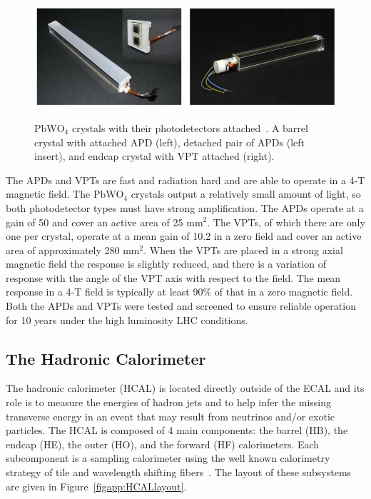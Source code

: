 \begin{figure}[!Hh]
       \centering
       \includegraphics[scale=0.5]{Figures/ECALphotodetectors.png} \\
       \caption[Photodetectors and crystal modules in the CMS eletromagnetic calorimeter.]{$\text{PbWO}_4$ crystals with their photodetectors attached~\cite{CMStdr}.  A barrel crystal with attached APD (left), detached pair of APDs (left insert), and endcap crystal with VPT attached (right).}
\label{figapp:ECALphotodetectors}
\end{figure}

The APDs and VPTs are fast and radiation hard and are able to operate in a 4-T magnetic field.  The $\text{PbWO}_4$ crystals output a relatively small amount of light, so both photodetector types must have strong amplification.  The APDs operate at a gain of 50 and cover an active area of 25 $\text{mm}^2$.  The VPTs, of which there are only one per crystal, operate at a mean gain of 10.2 in a zero field and cover an active area of approximately 280 $\text{mm}^2$.  When the VPTs are placed in a strong axial magnetic field the response is slightly reduced, and there is a variation of response with the angle of the VPT axis with respect to the field.  The mean response in a 4-T field is typically at least 90\% of that in a zero magnetic field.  Both the APDs and VPTs were tested and screened to ensure reliable operation for 10 years under the high luminosity LHC conditions.



\subsection{The Hadronic Calorimeter}
\label{hcal}


The hadronic calorimeter (HCAL) is located directly outside of the ECAL and its role is to measure the energies of hadron jets and to help infer the missing transverse energy in an event that may result from neutrinos and/or exotic particles.  The HCAL is composed of 4 main components: the barrel (HB), the endcap (HE), the outer (HO), and the forward (HF) calorimeters.  Each subcomponent is a sampling calorimeter using the well known calorimetry strategy of tile and wavelength shifting fibers~\cite{CMSdetector}.  The layout of these subsystems are given in Figure~\ref{figapp:HCALlayout}.


